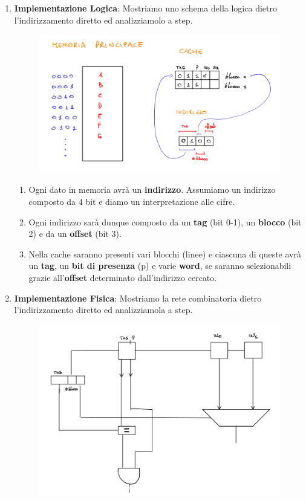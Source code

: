 \documentclass{article}
\begin{document}
\begin{enumerate}
    \item \textbf{Implementazione Logica}: Mostriamo uno schema della logica dietro \newline l'indirizzamento diretto ed analizziamolo a step.
    \begin{figure}[htbp]
        \center
        \includegraphics[scale=0.375]{img/ind_diretto_logico.png}
    \end{figure}
    \begin{enumerate}
        \item Ogni dato in memoria avrà un \textbf{indirizzo}. Assumiamo un indirizzo composto da $4$ bit e diamo un interpretazione alle cifre.
        \item Ogni indirizzo sarà dunque composto da un \textbf{tag} (bit 0-1), un \textbf{blocco} (bit 2) e da un \textbf{offset} (bit 3).
        \item Nella cache saranno presenti vari blocchi (linee) e ciascuna di queste avrà un \textbf{tag}, un \textbf{bit di presenza} (p) e varie \textbf{word}, se saranno selezionabili grazie all'\textbf{offset} determinato dall'indirizzo cercato. 
    \end{enumerate}
    \item \textbf{Implementazione Fisica}: Mostriamo la rete combinatoria dietro l'indirizzamento diretto ed analizziamola a step.
    \begin{figure}[htbp]
        \center
        \includegraphics[scale=0.325]{img/ind_diretto_fisico.png}

\end{figure}
\end{enumerate}
\end{document}
